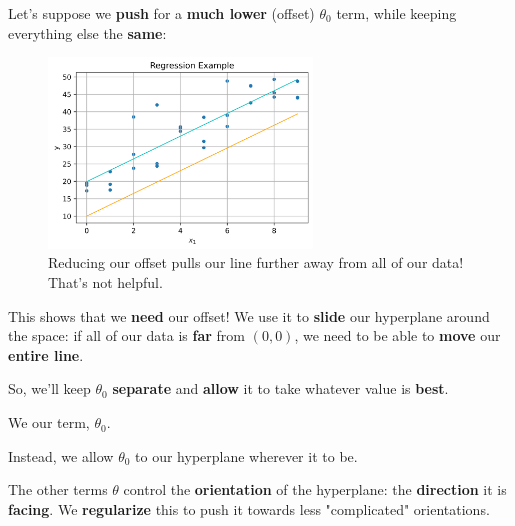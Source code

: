         Let's suppose we \textbf{push} for a \textbf{much lower} (offset) $\theta_0$ term, while keeping everything else the \textbf{same}:
        
        \begin{figure}[H]
        \centering
            \includegraphics[width=70mm,scale=0.5]{images/regression_images/Regression_Remove_Offset.png}
        
            \caption*{Reducing our offset pulls our line further away from all of our data! That's not helpful.}
        \end{figure}
        
        This shows that we \textbf{need} our offset! We use it to \textbf{slide} our hyperplane around the space: if all of our data is \textbf{far} from $(0,0)$, we need to be able to \textbf{move} our \textbf{entire line}.
        
        So, we'll keep $\theta_0$ \textbf{separate} and \textbf{allow} it to take whatever value is \textbf{best}.\\
        
        \begin{concept}
            We  our  term, $\theta_0$. 
            
            Instead, we allow $\theta_0$ to  our hyperplane wherever it  to be.
        \end{concept}
        
        The other terms $\theta$ control the \textbf{orientation} of the hyperplane: the \textbf{direction} it is \textbf{facing}. We \textbf{regularize} this to push it towards less "complicated" orientations.

        
